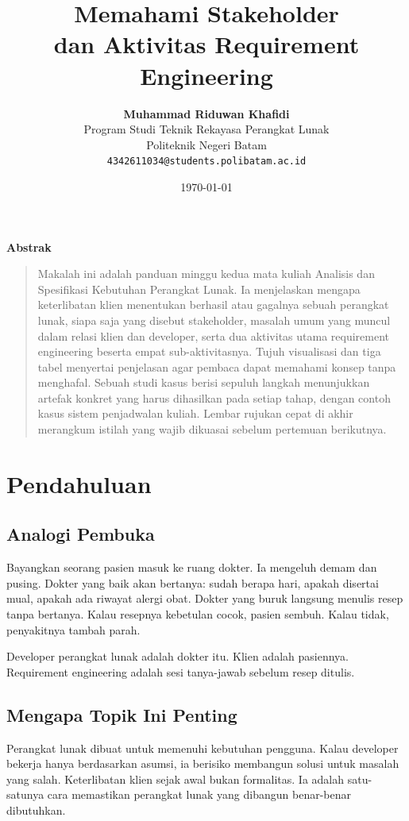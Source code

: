 \documentclass[11pt,a4paper]{article}
\title{\vspace{-1.5cm}\textbf{\sffamily\LARGE Memahami Stakeholder\\ dan Aktivitas Requirement Engineering}}
\author{
	\textbf{Muhammad Riduwan Khafidi} \\
	\small Program Studi Teknik Rekayasa Perangkat Lunak \\
	\small Politeknik Negeri Batam \\
	\small \texttt{4342611034@students.polibatam.ac.id}
}
\date{\small\today}
\renewenvironment{abstract}
{\small
	\begin{center}\textbf{\sffamily Abstrak}\end{center}
	\begin{quote}}
	{\end{quote}}
\begin{document}
\maketitle
\thispagestyle{empty}

\begin{abstract}
	Makalah ini adalah panduan minggu kedua mata kuliah Analisis dan Spesifikasi Kebutuhan Perangkat Lunak. Ia menjelaskan mengapa keterlibatan klien menentukan berhasil atau gagalnya sebuah perangkat lunak, siapa saja yang disebut stakeholder, masalah umum yang muncul dalam relasi klien dan developer, serta dua aktivitas utama requirement engineering beserta empat sub-aktivitasnya. Tujuh visualisasi dan tiga tabel menyertai penjelasan agar pembaca dapat memahami konsep tanpa menghafal. Sebuah studi kasus berisi sepuluh langkah menunjukkan artefak konkret yang harus dihasilkan pada setiap tahap, dengan contoh kasus sistem penjadwalan kuliah. Lembar rujukan cepat di akhir merangkum istilah yang wajib dikuasai sebelum pertemuan berikutnya.
\end{abstract}

\section{Pendahuluan}

\subsection{Analogi Pembuka}

Bayangkan seorang pasien masuk ke ruang dokter. Ia mengeluh demam dan pusing. Dokter yang baik akan bertanya: sudah berapa hari, apakah disertai mual, apakah ada riwayat alergi obat. Dokter yang buruk langsung menulis resep tanpa bertanya. Kalau resepnya kebetulan cocok, pasien sembuh. Kalau tidak, penyakitnya tambah parah.

Developer perangkat lunak adalah dokter itu. Klien adalah pasiennya. Requirement engineering adalah sesi tanya-jawab sebelum resep ditulis.

\subsection{Mengapa Topik Ini Penting}

Perangkat lunak dibuat untuk memenuhi kebutuhan pengguna. Kalau developer bekerja hanya berdasarkan asumsi, ia berisiko membangun solusi untuk masalah yang salah. Keterlibatan klien sejak awal bukan formalitas. Ia adalah satu-satunya cara memastikan perangkat lunak yang dibangun benar-benar dibutuhkan.
\end{document}
